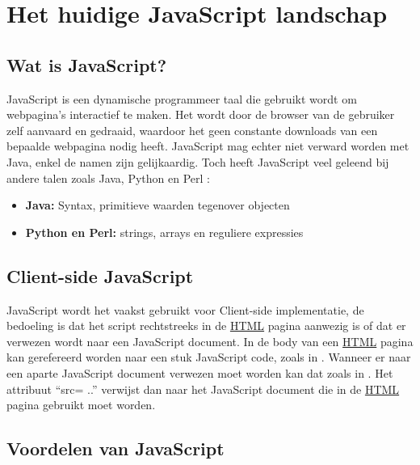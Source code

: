 \chapter{Het huidige JavaScript landschap}\label{ch:javascriptland}

\section{Wat is JavaScript?}\label{sec:JavaScript}

JavaScript is een dynamische programmeer taal die gebruikt wordt om webpagina's interactief te maken. Het wordt door de browser van de gebruiker zelf aanvaard en gedraaid, waardoor het geen constante downloads van een bepaalde webpagina nodig heeft. 
JavaScript mag echter niet verward worden met Java, enkel de namen zijn gelijkaardig. Toch heeft JavaScript veel geleend bij andere talen zoals Java, Python en Perl : 
	\begin{itemize}
		\item \textbf{Java:} Syntax, primitieve waarden tegenover objecten
		\item \textbf{Python en Perl:} strings, arrays en reguliere expressies
	\end{itemize}
\section{Client-side JavaScript}\label{sec:csjs}
JavaScript wordt het vaakst gebruikt voor Client-side implementatie, de bedoeling is dat het script rechtstreeks in de \hyperref[html]{HTML} pagina aanwezig is of dat er verwezen wordt naar een JavaScript document.
In de body van een \hyperref[html]{HTML} pagina kan gerefereerd worden naar een stuk JavaScript code, zoals in .
	Wanneer er naar een aparte JavaScript document verwezen moet worden kan dat zoals in . Het attribuut “src= ..” verwijst dan naar het JavaScript document die in de \hyperref[html]{HTML} pagina gebruikt moet worden.   
	\section{Voordelen van JavaScript}
	
